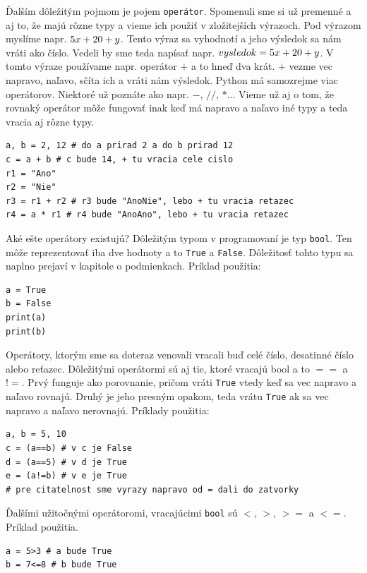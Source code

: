 Ďalším dôležitým pojmom je pojem \texttt{operátor}. Spomenuli sme si už premenné a aj to, že majú rôzne typy a vieme ich použiť v zložitejších výrazoch. Pod výrazom myslíme napr. $5\*x + 20 + y$. Tento výraz sa vyhodnotí a jeho výsledok sa nám vráti ako číslo. Vedeli by sme teda napísať napr. $vysledok = 5\*x + 20 + y$. V tomto výraze používame napr. operátor $+$ a to hneď dva krát. $+$ vezme vec napravo, naľavo, sčíta ich a vráti nám výsledok. Python má samozrejme viac operátorov. Niektoré už poznáte ako napr. $-$, $//$, $*$... Vieme už aj o tom, že rovnaký operátor môže fungovať inak keď má napravo a naľavo iné typy a teda vracia aj rôzne typy.

\begin{lstlisting}
a, b = 2, 12 # do a prirad 2 a do b prirad 12
c = a + b # c bude 14, + tu vracia cele cislo
r1 = "Ano"
r2 = "Nie"
r3 = r1 + r2 # r3 bude "AnoNie", lebo + tu vracia retazec
r4 = a * r1 # r4 bude "AnoAno", lebo + tu vracia retazec
\end{lstlisting}

Aké ešte operátory existujú? Dôležitým typom v programovaní je typ \texttt{bool}. Ten môže reprezentovať iba dve hodnoty a to \texttt{True} a \texttt{False}. Dôležitosť tohto typu sa naplno prejaví v kapitole o podmienkach. Príklad použitia:

\begin{lstlisting}
a = True
b = False
print(a)
print(b)
\end{lstlisting}

Operátory, ktorým sme sa doteraz venovali vracali buď celé číslo, desatinné číslo alebo reťazec. Dôležitými operátormi sú aj tie, ktoré vracajú bool a to $==$ a $!=$. Prvý funguje ako porovnanie, pričom vráti \texttt{True} vtedy keď sa vec napravo a naľavo rovnajú. Druhý je jeho presným opakom, teda  vrátu \texttt{True} ak sa vec napravo a naľavo nerovnajú. Príklady použitia:

\begin{lstlisting}
a, b = 5, 10
c = (a==b) # v c je False
d = (a==5) # v d je True
e = (a!=b) # v e je True
# pre citatelnost sme vyrazy napravo od = dali do zatvorky
\end{lstlisting}

Ďalšími užitočnými operátoromi, vracajúcimi \texttt{bool} sú $<$, $>$, $>=$ a $<=$. Príklad použitia.

\begin{lstlisting}
a = 5>3 # a bude True
b = 7<=8 # b bude True
\end{lstlisting}

